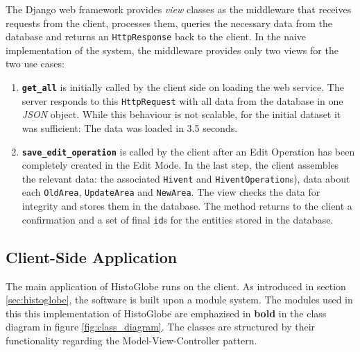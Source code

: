 The Django web framework provides \emph{view} classes as the middleware that receives requests from the client, processes them, queries the necessary data from the database and returns an \texttt{HttpResponse} back to the client. In the naive implementation of the system, the middleware provides only two views for the two use cases:

\begin{enumerate}
  \item \textbf{\texttt{get\_all}} is initially called by the client side on loading the web service. The server responds to this \texttt{HttpRequest} with all data from the database in one \emph{JSON} object. While this behaviour is not scalable, for the initial dataset it was sufficient: The data was loaded in 3.5 seconds.
  \item \textbf{\texttt{save\_edit\_operation}} is called by the client after an Edit Operation has been completely created in the Edit Mode. In the last step, the client assembles the relevant data: the associated \texttt{Hivent} and \texttt{HiventOperation}s), data about each \texttt{OldArea}, \texttt{UpdateArea} and \texttt{NewArea}. The view checks the data for integrity and stores them in the database. The method returns to the client a confirmation and a set of final \texttt{id}s for the entities stored in the database.
\end{enumerate}



\subsection{Client-Side Application} %
\label{sub:client_side_application}

The main application of HistoGlobe runs on the client. As introduced in section \ref{sec:histoglobe}, the software is built upon a module system. The modules used in this this implementation of HistoGlobe are emphazised in \textbf{bold} in the class diagram in figure \ref{fig:class_diagram}. The classes are structured by their functionality regarding the Model-View-Controller pattern.

